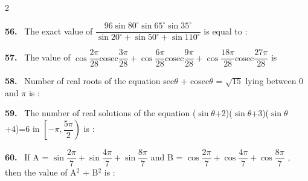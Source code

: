 \documentclass[10pt]{extarticle}
\newcommand{\qn}[1]{\par\smallskip\noindent\textbf{#1.}~}
\begin{document}
\begin{multicols}{2}
\qn{56} The exact value of $\dfrac{96\sin80^\circ\sin65^\circ\sin35^\circ}{\sin20^\circ+\sin50^\circ+\sin110^\circ}$ is equal to :
\qn{57} The value of $\cos\dfrac{2\pi}{28}\mathrm{cosec}\dfrac{3\pi}{28}+\cos\dfrac{6\pi}{28}\mathrm{cosec}\dfrac{9\pi}{28}+\cos\dfrac{18\pi}{28}\mathrm{cosec}\dfrac{27\pi}{28}$ is
\qn{58} Number of real roots of the equation sec$\theta$ + cosec$\theta$ = $\sqrt{15}$ lying between 0 and $\pi$ is :
\qn{59} The number of real solutions of the equation ($\sin\theta$+2)($\sin\theta$+3)($\sin\theta$+4)=6 in $\left[-\pi,\dfrac{5\pi}2\right)$ is :
\qn{60} If A = $\sin\dfrac{2\pi}7+\sin\dfrac{4\pi}7+\sin\dfrac{8\pi}7$ and B = $\cos\dfrac{2\pi}7+\cos\dfrac{4\pi}7+\cos\dfrac{8\pi}7$ , then the value of A$^2$ + B$^2$ is :
\end{multicols}
\end{document}
